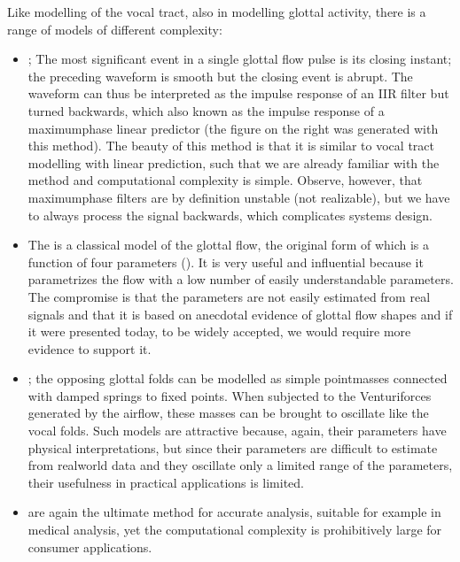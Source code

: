 \documentclass[letterpaper,10pt,english]{jupyterBook}
\begin{document}
\sphinxAtStartPar
Like modelling of the vocal tract, also in modelling glottal activity,
there is a range of models of different complexity:
\begin{itemize}
\item {} 
\sphinxAtStartPar
{}; The most significant event in a
single glottal flow pulse is its closing instant; the preceding
waveform is smooth but the closing event is abrupt. The waveform can
thus be interpreted as the impulse response of an IIR filter but
turned backwards, which also known as the impulse response of a
maximum\sphinxhyphen{}phase linear predictor (the figure on the right was
generated with this method). The beauty of this method is that it is
similar to vocal tract modelling with linear prediction, such that
we are already familiar with the method and computational complexity
is simple. Observe, however, that maximum\sphinxhyphen{}phase filters are by
definition unstable (not realizable), but we have to always process
the signal backwards, which complicates systems design.

\item {} 
\sphinxAtStartPar
The  is a classical model of the
glottal flow, the original form of which is a function of four
parameters ().
It is very useful and influential because it parametrizes the flow
with a low number of easily understandable parameters. The
compromise is that the parameters are not easily estimated from real
signals and that it is based on anecdotal evidence of glottal flow
shapes and if it were presented today, to be widely accepted, we
would require more evidence to support it.

\item {} 
\sphinxAtStartPar
{};
the opposing glottal folds can be modelled as simple point\sphinxhyphen{}masses
connected with damped springs to fixed points. When subjected to the
Venturi\sphinxhyphen{}forces generated by the airflow, these masses can be brought
to oscillate like the vocal folds. Such models are attractive
because, again, their parameters have physical interpretations, but
since their parameters are difficult to estimate from real\sphinxhyphen{}world
data and they oscillate only a limited range of the parameters,
their usefulness in practical applications is limited.

\item {} 
\sphinxAtStartPar
{} are
again the ultimate method for accurate analysis, suitable for
example in medical analysis, yet the computational complexity is
prohibitively large for consumer applications.

\end{itemize}
\end{document}
